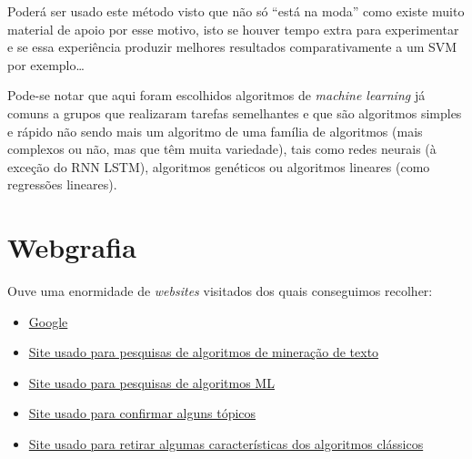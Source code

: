 \documentclass[a4paper,10pt]{article}
\begin{document}
Poderá ser usado este método visto que não só ``está na moda'' como existe muito material de apoio por esse motivo, isto se houver tempo extra para experimentar e se essa experiência produzir melhores resultados comparativamente a um SVM por exemplo\ldots

Pode-se notar que aqui foram escolhidos algoritmos de \textit{machine learning} já comuns a grupos que realizaram tarefas semelhantes e que são algoritmos simples e rápido não sendo mais um algoritmo de uma família de algoritmos (mais complexos ou não, mas que têm muita variedade), tais como redes neurais (à exceção do RNN LSTM), algoritmos genéticos ou algoritmos lineares (como regressões lineares).

\section{Webgrafia}

Ouve uma enormidade de \textit{websites} visitados dos quais conseguimos recolher:
\begin{itemize}
    \item \href{https://www.google.com/}{Google}
    \item \href{https://www.devmedia.com.br/mineracao-de-texto-analise-comparativa-de-algoritmos-revista-sql-magazine-138/34013}{Site usado para pesquisas de algoritmos de mineração de texto}
    \item \href{https://azure.microsoft.com/pt-pt/overview/machine-learning-algorithms/#overview}{Site usado para pesquisas de algoritmos ML}
    \item \href{https://rockcontent.com/br/blog/web-crawler/}{Site usado para confirmar alguns tópicos}
    \item \href{https://www.geekboots.com/story/classic-algorithm-vs-ml-algorithm}{Site usado para retirar algumas características dos algoritmos clássicos}
\end{itemize}
\end{document}
